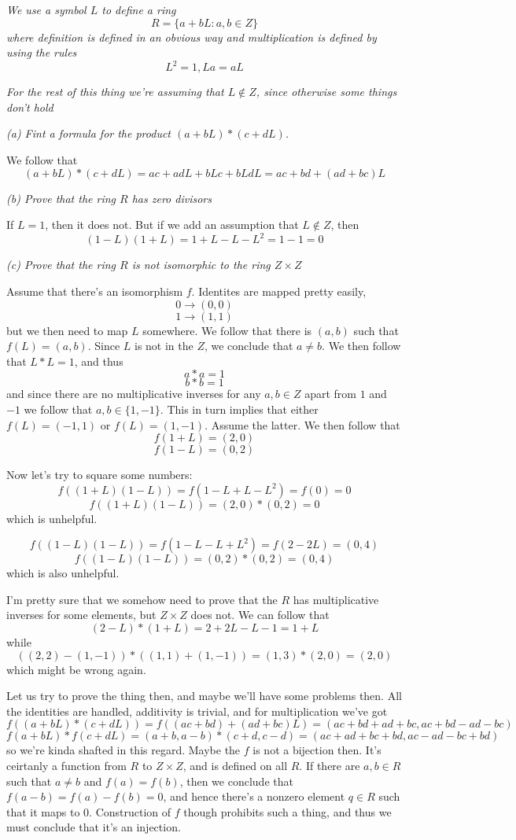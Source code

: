 \documentclass[11pt,oneside,titlepage]{book}
\newcommand{\set}[1]{\{ #1 \}}
\begin{document}
\textit{We use a symbol $L$ to define a ring
  $$R = \set{a + bL: a, b \in Z}$$
  where definition is defined in an obvious way and multiplication is defined
  by using the rules
  $$L^2 = 1, La = aL$$
}

\textit{For the rest of this thing we're assuming that $L \notin Z$, since
otherwise some things don't hold}

\textit{(a) Fint a formula for the product $(a + bL) * (c + dL)$.}

We follow that
$$(a + bL) * (c + dL) = ac + adL + bLc + bLdL = ac + bd + (ad + bc)L$$ 

\textit{(b) Prove that the ring $R$ has zero divisors}

If $L = 1$, then it does not. But if we add an assumption that $L \notin Z$,
then
$$(1 - L) (1 + L) = 1 + L - L - L^2 = 1 - 1 =  0$$

\textit{(c) Prove that the ring $R$ is not isomorphic to the ring $Z \times Z$}

Assume that there's an isomorphism $f$. Identites are mapped pretty
easily,
$$0 \to (0, 0)$$
$$1 \to (1, 1)$$
but we then need to map $L$ somewhere. We follow that there is $(a,
b)$ such that $f(L) = (a, b)$. Since $L$ is not in the $Z$, we
conclude that $a \neq b$. We then follow that $L * L = 1$, and thus
$$a * a = 1$$
$$b * b = 1$$
and since there are no multiplicative inverses for any $a, b \in Z$
apart from $1$ and $-1$ we follow that $a, b \in \set{1, -1}$.  This
in turn implies that either $f(L) = (-1, 1)$ or $f(L) = (1, -1)$.
Assume the latter. We then follow that
$$f(1 + L) = (2, 0)$$
$$f(1 - L) = (0, 2)$$

Now let's try to square some numbers:
$$f((1 + L)(1 - L)) = f(1 - L + L - L^2) = f(0) = 0$$
$$f((1 + L)(1 - L)) = (2, 0) * (0, 2) = 0$$
which is unhelpful.

$$f((1 - L)(1 - L)) = f(1 - L - L + L^2) = f(2 - 2L) = (0, 4)$$
$$f((1 - L)(1 - L)) = (0, 2) * (0, 2) = (0, 4)$$
which is also unhelpful.

I'm pretty sure that we somehow need to prove that the $R$ has
multiplicative inverses for some elements, but $Z \times Z$ does not.
We can follow that
$$(2 - L) * (1 + L) = 2 + 2L - L - 1 = 1 + L$$
while
$$((2, 2) - (1, -1)) * ((1, 1) + (1, -1)) = (1, 3) * (2, 0) = (2, 0)$$
which might be wrong again.

Let us try to prove the thing then, and maybe we'll have some problems
then. All the identities are handled, additivity is trivial, and for
multiplication we've got
$$f((a + bL) * (c + dL)) = f((ac + bd) + (ad + bc)L)
= (ac + bd + ad + bc, ac + bd - ad - bc)$$
$$f(a + bL) * f(c + dL) = (a + b, a - b) * (c + d, c - d)
= (ac + ad + bc + bd, ac - ad - bc + bd)$$
so we're kinda shafted in this regard. Maybe the $f$ is not a
bijection then. It's ceirtanly a function from $R$ to $Z \times Z$,
and is defined on all $R$. If there are $a, b \in R$ such that $a \neq
b$ and $f(a) = f(b)$, then we conclude that $f(a - b) = f(a) - f(b) =
0$, and hence there's a nonzero element $q \in R$ such that it maps to
$0$. Construction of $f$ though prohibits such a thing, and thus we
must conclude that it's an injection.
\end{document}
